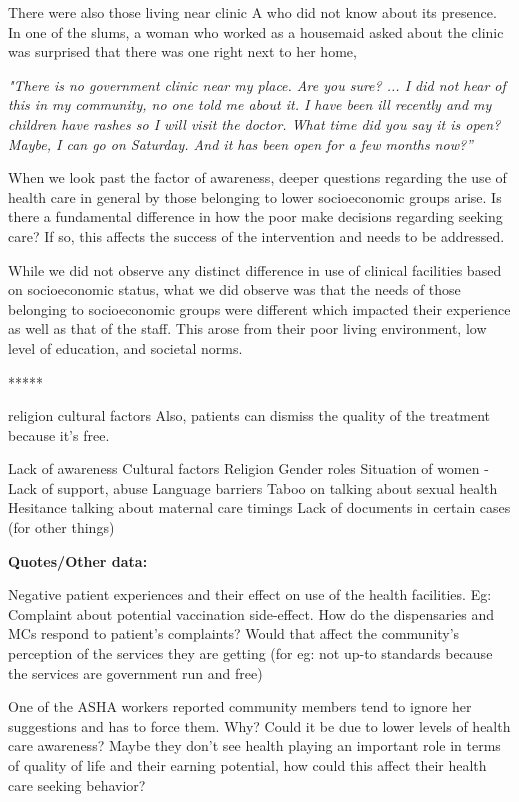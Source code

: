 There were also those living near clinic A who did not know about its presence. In one of the slums, a woman who worked as a housemaid asked about the clinic was surprised that there was one right next to her home,

\textit{"There is no government clinic near my place. Are you sure? ... I did not hear of this in my community, no one told me about it. I have been ill recently and my children have rashes so I will visit the doctor. What time did you say it is open? Maybe, I can go on Saturday. And it has been open for a few months now?”}

When we look past the factor of awareness, deeper questions regarding the use of health care in general by those belonging to lower socioeconomic groups arise. Is there a fundamental difference in how the poor make decisions regarding seeking care? If so, this affects the success of the intervention and needs to be addressed. 

While we did not observe any distinct difference in use of clinical facilities based on socioeconomic status, what we did observe was that the needs of those belonging to socioeconomic groups were different which impacted their experience as well as that of the staff. This arose from their poor living environment, low level of education, and societal norms.



*****

religion
cultural factors
Also, patients can dismiss the quality of the treatment because it’s free.

Lack of awareness
Cultural factors
Religion
Gender roles
Situation of women - Lack of support, abuse
Language barriers
Taboo on talking about sexual health
Hesitance talking about maternal care
timings
Lack of documents in certain cases (for other things)

\textbf{Quotes/Other data:}

Negative patient experiences and their effect on use of the health facilities. Eg: Complaint about potential vaccination side-effect. How do the dispensaries and MCs respond to patient's complaints? Would that affect the community's perception of the services they are getting (for eg: not up-to standards because the services are government run and free)

One of the ASHA workers reported community members tend to ignore her suggestions and has to force them. Why? Could it be due to lower levels of health care awareness? Maybe they don't see health playing an important role in terms of quality of life and their earning potential, how could this affect their health care seeking behavior? 


